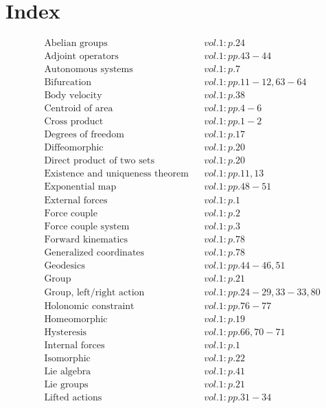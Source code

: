 \documentclass[a4paper]{article}
\begin{document}
 
\section*{Index} 
\allowdisplaybreaks 
\begin{align*} 
&\text{Abelian groups}&& vol. 1: p. 24\\
&\text{Adjoint operators}&& vol. 1: pp. 43-44\\
&\text{Autonomous systems}&& vol. 1: p. 7\\
&\text{Bifurcation}&& vol. 1: pp. 11-12, 63-64\\
&\text{Body velocity}&& vol. 1: p. 38\\
&\text{Centroid of area}&& vol. 1: pp. 4-6\\
&\text{Cross product}&& vol. 1: pp. 1-2\\
&\text{Degrees of freedom}&& vol. 1: p. 17\\
&\text{Diffeomorphic}&& vol. 1: p. 20\\
&\text{Direct product of two sets}&& vol. 1: p. 20\\
&\text{Existence and uniqueness theorem}&& vol. 1: pp. 11, 13\\
&\text{Exponential map}&& vol. 1: pp. 48-51\\
&\text{External forces}&& vol. 1: p. 1\\
&\text{Force couple}&& vol. 1: p. 2\\
&\text{Force couple system}&& vol. 1: p. 3\\
&\text{Forward kinematics}&& vol. 1: p. 78\\
&\text{Generalized coordinates}&& vol. 1: p. 78\\
&\text{Geodesics}&& vol. 1: pp. 44-46, 51\\
&\text{Group}&& vol. 1: p. 21\\
&\text{Group, left/right action}&& vol. 1: pp. 24-29, 33-33, 80\\
&\text{Holonomic constraint}&& vol. 1: pp. 76-77\\
&\text{Homeomorphic}&& vol. 1: p. 19\\
&\text{Hysteresis}&& vol. 1: pp. 66, 70-71\\
&\text{Internal forces}&& vol. 1: p. 1\\
&\text{Isomorphic}&& vol. 1: p. 22\\
&\text{Lie algebra}&& vol. 1: p. 41\\
&\text{Lie groups}&& vol. 1: p. 21\\
&\text{Lifted actions}&& vol. 1: pp. 31-34\\

\end{align*}
\end{document}

